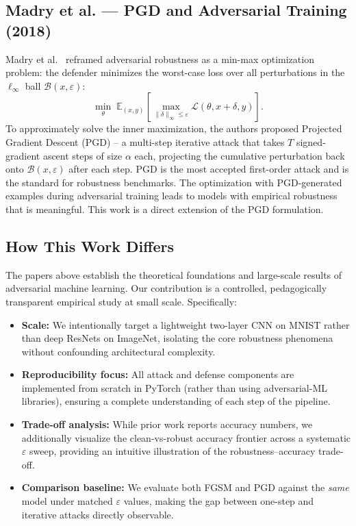\documentclass[conference,10pt]{IEEEtran}
\begin{document}
\subsection{Madry et al. — PGD and Adversarial Training (2018)}

Madry et al.~\cite{madry2018pgd} reframed adversarial robustness as a
min-max optimization problem: the defender minimizes the worst-case loss
over all perturbations in the $\ell_\infty$ ball $\mathcal{B}(x,\varepsilon)$:
\begin{equation}
    \min_\theta \; \mathbb{E}_{(x,y)} \left[
        \max_{\|\delta\|_\infty \leq \varepsilon}
        \mathcal{L}(\theta, x{+}\delta, y)
    \right].
    \label{eq:pgd_objective}
\end{equation}
To approximately solve the inner maximization, the authors proposed Projected Gradient Descent (PGD) -- a multi-step iterative attack that takes $T$ signed-gradient ascent steps of size $\alpha$ each, projecting the cumulative perturbation back onto $\mathcal{B}(x,\varepsilon)$ after each step. PGD is the most accepted first-order attack and is the standard for robustness benchmarks. The optimization with PGD-generated examples during adversarial training leads to models with empirical robustness that is meaningful. This work is a direct extension of the PGD formulation.


\subsection{How This Work Differs}

The papers above establish the theoretical foundations and large-scale
results of adversarial machine learning. Our contribution is a controlled,
pedagogically transparent empirical study at small scale. Specifically:

\begin{itemize}
    \item \textbf{Scale:} We intentionally target a lightweight two-layer
          CNN on MNIST rather than deep ResNets on ImageNet, isolating the
          core robustness phenomena without confounding architectural
          complexity.

    \item \textbf{Reproducibility focus:} All attack and defense components
          are implemented from scratch in PyTorch (rather than using
          adversarial-ML libraries), ensuring a complete understanding of
          each step of the pipeline.

    \item \textbf{Trade-off analysis:} While prior work reports accuracy
          numbers, we additionally visualize the clean-vs-robust accuracy
          frontier across a systematic $\varepsilon$ sweep, providing an
          intuitive illustration of the robustness–accuracy trade-off.

    \item \textbf{Comparison baseline:} We evaluate both FGSM and PGD
          against the \emph{same} model under matched $\varepsilon$ values,
          making the gap between one-step and iterative attacks directly
          observable.
\end{itemize}
\end{document}
